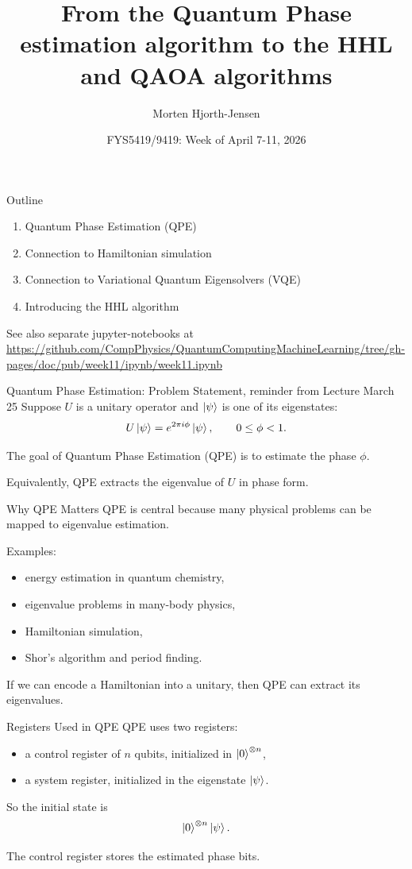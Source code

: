 \documentclass{beamer}
\title{From the Quantum Phase estimation algorithm to the HHL and QAOA algorithms}
\author{Morten Hjorth-Jensen}
\date{FYS5419/9419: Week of April 7-11, 2026}
\begin{document}
\frame{\titlepage}

\begin{frame}{Outline}
\begin{enumerate}
\item Quantum Phase Estimation (QPE)
\item Connection to Hamiltonian simulation
\item Connection to Variational Quantum Eigensolvers (VQE)
\item Introducing the HHL algorithm
\end{enumerate}
See also separate jupyter-notebooks at \url{https://github.com/CompPhysics/QuantumComputingMachineLearning/tree/gh-pages/doc/pub/week11/ipynb/week11.ipynb}
\end{frame}


\begin{frame}{Quantum Phase Estimation: Problem Statement, reminder from Lecture March 25}
Suppose \(U\) is a unitary operator and \(\ket{\psi}\) is one of its eigenstates:
\[
U\ket{\psi}=e^{2\pi i \phi}\ket{\psi},
\qquad 0\le \phi <1.
\]

The goal of Quantum Phase Estimation (QPE) is to estimate the phase \(\phi\).

Equivalently, QPE extracts the eigenvalue of \(U\) in phase form.
\end{frame}

\begin{frame}{Why QPE Matters}
QPE is central because many physical problems can be mapped to eigenvalue estimation.

Examples:
\begin{itemize}
\item energy estimation in quantum chemistry,
\item eigenvalue problems in many-body physics,
\item Hamiltonian simulation,
\item Shor's algorithm and period finding.
\end{itemize}

If we can encode a Hamiltonian into a unitary, then QPE can extract its eigenvalues.
\end{frame}

\begin{frame}{Registers Used in QPE}
QPE uses two registers:

\begin{itemize}
\item a control register of \(n\) qubits, initialized in \(\ket{0}^{\otimes n}\),
\item a system register, initialized in the eigenstate \(\ket{\psi}\).
\end{itemize}

So the initial state is
\[
\ket{0}^{\otimes n}\ket{\psi}.
\]

The control register stores the estimated phase bits.
\end{frame}
\end{document}
